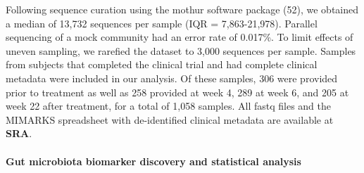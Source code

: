 \documentclass[12pt,]{article}
\let\oldparagraph\paragraph
\renewcommand{\paragraph}[1]{\oldparagraph{#1}\mbox{}}
\begin{document}
Following sequence curation using the mothur software package (52), we
obtained a median of 13,732 sequences per sample (IQR = 7,863-21,978).
Parallel sequencing of a mock community had an error rate of 0.017\%. To
limit effects of uneven sampling, we rarefied the dataset to 3,000
sequences per sample. Samples from subjects that completed the clinical
trial and had complete clinical metadata were included in our analysis.
Of these samples, 306 were provided prior to treatment as well as 258
provided at week 4, 289 at week 6, and 205 at week 22 after treatment,
for a total of 1,058 samples. All fastq files and the MIMARKS
spreadsheet with de-identified clinical metadata are available at
\textbf{SRA}.

\paragraph{Gut microbiota biomarker discovery and statistical
analysis}\label{gut-microbiota-biomarker-discovery-and-statistical-analysis}
\end{document}
